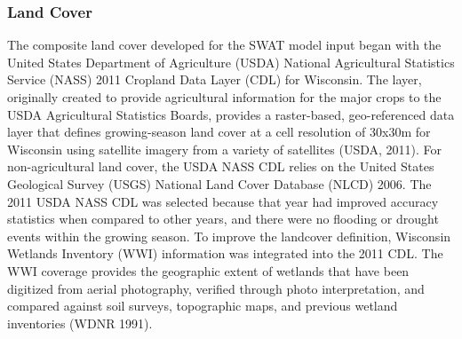 \subsubsection{Land Cover}\label{sec:land_cover}
The composite land cover developed for the SWAT model input began with the United States Department of Agriculture (USDA) National Agricultural Statistics Service (NASS) 2011 Cropland Data Layer (CDL) for Wisconsin. The layer, originally created to provide agricultural information for the major crops to the USDA Agricultural Statistics Boards, provides a raster-based, geo-referenced data layer that defines growing-season land cover at a cell resolution of 30x30m for Wisconsin using satellite imagery from a variety of satellites (USDA, 2011). For non-agricultural land cover, the USDA NASS CDL relies on the United States Geological Survey (USGS) National Land Cover Database (NLCD) 2006. The 2011 USDA NASS CDL was selected because that year had improved accuracy statistics when compared to other years, and there were no flooding or drought events within the growing season. To improve the landcover definition, Wisconsin Wetlands Inventory (WWI) information was integrated into the 2011 CDL. The WWI coverage provides the geographic extent of wetlands that have been digitized from aerial photography, verified through photo interpretation, and compared against soil surveys, topographic maps, and previous wetland inventories (WDNR 1991).